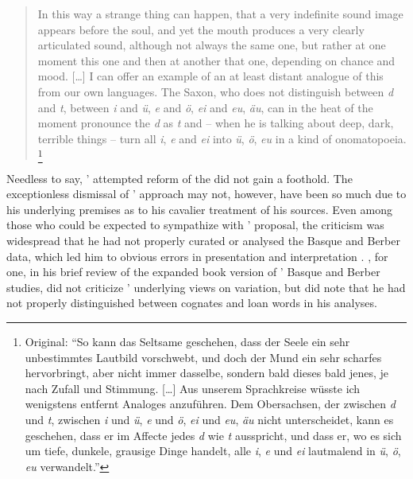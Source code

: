 \documentclass[output=paper]{langscibook}
\begin{document}
\begin{quotation}
In this way a strange thing can happen, that a very indefinite sound image appears before the soul, and yet the mouth produces a very clearly articulated sound, although not always the same one, but rather at one moment this one and then at another that one, depending on chance and mood. […] I can offer an example of an at least distant analogue of this from our own languages. The Saxon, who does not distinguish between \emph{d} and \emph{t}, between \emph{i} and \emph{ü}, \emph{e} and \emph{ö}, \emph{ei} and \emph{eu}, \emph{äu}, can in the heat of the moment pronounce the \emph{d} as \emph{t} and -- when he is talking about deep, dark, terrible things -- turn all \emph{i}, \emph{e} and \emph{ei} into \emph{ü}, \emph{ö}, \emph{eu} in a kind of onomatopoeia. \citep[606--607]{Gabelentz1893}\footnote{Original: ``So kann das Seltsame geschehen, dass der Seele ein sehr unbestimmtes Lautbild vorschwebt, und doch der Mund ein sehr scharfes hervorbringt, aber nicht immer dasselbe, sondern bald dieses bald jenes, je nach Zufall und Stimmung. […] Aus unserem Sprachkreise wüsste ich wenigstens entfernt Analoges anzuführen. Dem Obersachsen, der zwischen \emph{d} und \emph{t}, zwischen \emph{i} und \emph{ü}, \emph{e} und \emph{ö}, \emph{ei} und \emph{eu}, \emph{äu} nicht unterscheidet, kann es geschehen, dass er im Affecte jedes \emph{d} wie \emph{t} ausspricht, und dass er, wo es sich um tiefe, dunkele, grausige Dinge handelt, alle \emph{i}, \emph{e} und \emph{ei} lautmalend in \emph{ü}, \emph{ö}, \emph{eu} verwandelt.''}
\end{quotation}

Needless to say, {\Gabelentz}' attempted reform of the  did not gain a foothold. The exceptionless dismissal of {\Gabelentz}' approach may not, however, have been so much due to his underlying premises as to his cavalier treatment of his sources. Even among those who could be expected to sympathize with {\Gabelentz}' proposal, the criticism was widespread that he had not properly curated or analysed the Basque and Berber data, which led him to obvious errors in presentation and interpretation \citep[cf.][]{HurchPurgay2019}. \citet{Brinton1894}, for one, in his brief review of the \citeyear{Gabelentz1894bb} expanded book version of {\Gabelentz}' Basque and Berber studies, did not criticize {\Gabelentz}' underlying views on variation, but did note that he had not properly distinguished between cognates and loan words in his analyses.
\end{document}
